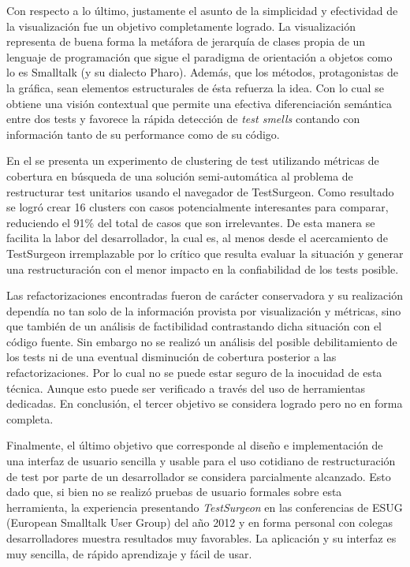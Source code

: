 \par Con respecto a lo último, justamente el asunto de la simplicidad y efectividad de la visualización fue un objetivo completamente logrado. La visualización representa de buena forma la metáfora de jerarquía de clases propia de un lenguaje de programación que sigue el paradigma de orientación a objetos como lo es Smalltalk (y su dialecto Pharo). Además, que los métodos, protagonistas de la gráfica, sean elementos estructurales de ésta refuerza la idea. Con lo cual se obtiene una visión contextual que permite una efectiva diferenciación semántica entre dos tests y favorece la rápida detección de \emph{test smells} contando con información tanto de su performance como de su código.

\par En el  se presenta un experimento de clustering de test utilizando métricas de cobertura en búsqueda de una solución semi-automática al problema de restructurar test unitarios usando el navegador de TestSurgeon. Como resultado se logró crear 16 clusters con casos potencialmente interesantes para comparar, reduciendo el 91\% del total de casos que son irrelevantes. De esta manera se facilita la labor del desarrollador, la cual es, al menos desde el acercamiento de TestSurgeon irremplazable por lo crítico que resulta evaluar la situación y generar una restructuración con el menor impacto en la confiabilidad de los tests posible.

\par Las refactorizaciones encontradas fueron de carácter conservadora y su realización dependía no tan solo de la información provista por visualización y métricas, sino que también de un análisis de factibilidad contrastando dicha situación con el código fuente. Sin embargo no se realizó un análisis del posible debilitamiento de los tests ni de una eventual disminución de cobertura posterior a las refactorizaciones. Por lo cual no se puede estar seguro de la inocuidad de esta técnica. Aunque esto puede ser verificado a través del uso de herramientas dedicadas. En conclusión, el tercer objetivo se considera logrado pero no en forma completa.

\par Finalmente, el último objetivo que corresponde al diseño e implementación de una interfaz de usuario sencilla y usable para el uso cotidiano de restructuración de test por parte de un desarrollador se considera parcialmente alcanzado. Esto dado que, si bien no se realizó pruebas de usuario formales sobre esta herramienta, la experiencia presentando \emph{TestSurgeon} en las conferencias de ESUG (European Smalltalk User Group) del año 2012 y en forma personal con colegas desarrolladores muestra resultados muy favorables. La aplicación y su interfaz es muy sencilla, de rápido aprendizaje y fácil de usar.

